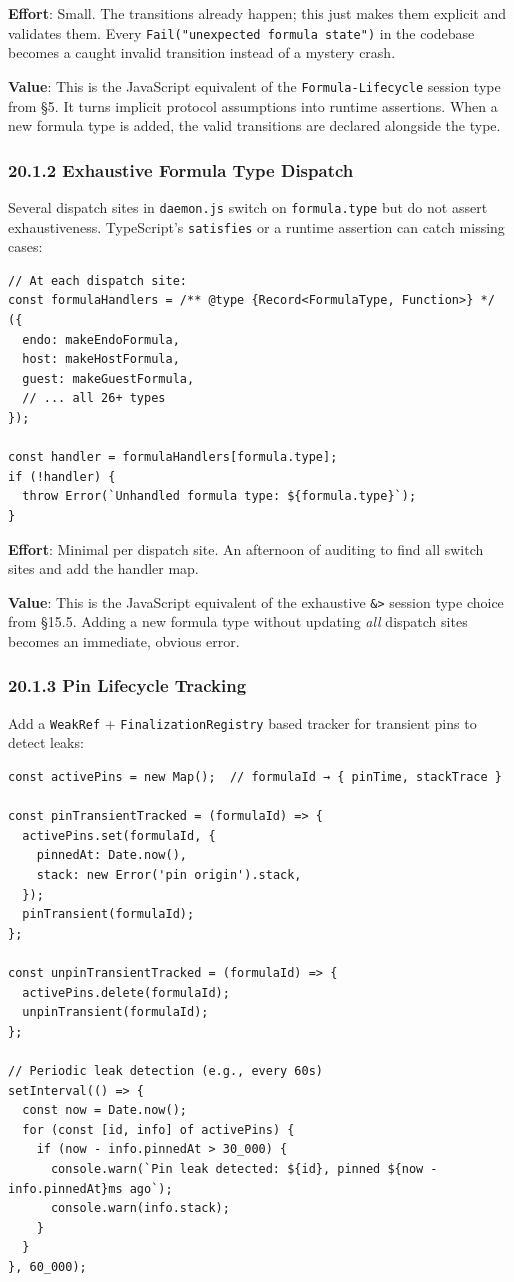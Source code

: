 \documentclass[11pt]{article}
\begin{document}
\textbf{Effort}: Small. The transitions already happen; this just makes them
explicit and validates them. Every \texttt{Fail("unexpected formula state")} in the
codebase becomes a caught invalid transition instead of a mystery crash.

\textbf{Value}: This is the JavaScript equivalent of the \texttt{Formula-Lifecycle}
session type from §5. It turns implicit protocol assumptions into runtime
assertions. When a new formula type is added, the valid transitions are
declared alongside the type.
\subsubsection{20.1.2 Exhaustive Formula Type Dispatch}
\label{sec:org358c2c9}

Several dispatch sites in \texttt{daemon.js} switch on \texttt{formula.type} but do not
assert exhaustiveness. TypeScript's \texttt{satisfies} or a runtime assertion can
catch missing cases:

\begin{verbatim}
// At each dispatch site:
const formulaHandlers = /** @type {Record<FormulaType, Function>} */ ({
  endo: makeEndoFormula,
  host: makeHostFormula,
  guest: makeGuestFormula,
  // ... all 26+ types
});

const handler = formulaHandlers[formula.type];
if (!handler) {
  throw Error(`Unhandled formula type: ${formula.type}`);
}
\end{verbatim}

\textbf{Effort}: Minimal per dispatch site. An afternoon of auditing to find all
switch sites and add the handler map.

\textbf{Value}: This is the JavaScript equivalent of the exhaustive \texttt{\&>} session
type choice from §15.5. Adding a new formula type without updating \emph{all}
dispatch sites becomes an immediate, obvious error.
\subsubsection{20.1.3 Pin Lifecycle Tracking}
\label{sec:org1205fd5}

Add a \texttt{WeakRef} + \texttt{FinalizationRegistry} based tracker for transient pins
to detect leaks:

\begin{verbatim}
const activePins = new Map();  // formulaId → { pinTime, stackTrace }

const pinTransientTracked = (formulaId) => {
  activePins.set(formulaId, {
    pinnedAt: Date.now(),
    stack: new Error('pin origin').stack,
  });
  pinTransient(formulaId);
};

const unpinTransientTracked = (formulaId) => {
  activePins.delete(formulaId);
  unpinTransient(formulaId);
};

// Periodic leak detection (e.g., every 60s)
setInterval(() => {
  const now = Date.now();
  for (const [id, info] of activePins) {
    if (now - info.pinnedAt > 30_000) {
      console.warn(`Pin leak detected: ${id}, pinned ${now - info.pinnedAt}ms ago`);
      console.warn(info.stack);
    }
  }
}, 60_000);
\end{verbatim}
\end{document}
